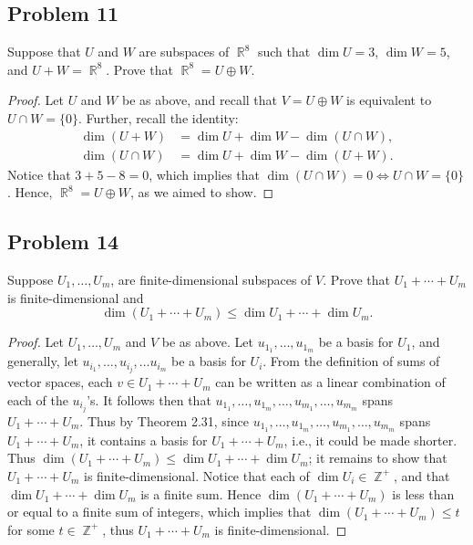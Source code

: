 \documentclass[letterpaper, 12pt]{amsart}
\DeclareMathOperator{\Z}{\mathbb{Z}}
\DeclareMathOperator{\R}{\mathbb{R}}
\theoremstyle{definition}  %
\begin{document}
		\subsection*{Problem 11}
		Suppose that $U$ and $W$ are subspaces of $\R^{8}$ such that $\dim U = 3$, $\dim W = 5$, and $U + W = \R^{8}$. 
		Prove that $\R^{8} = U \oplus W$.

		\begin{proof}
		Let $U$ and $W$ be as above, and recall that $V = U \oplus W$ is equivalent to $U \cap W = \{ 0 \}$.
		Further, recall the identity:
			\begin{align*}
				\dim(U + W) &= \dim U + \dim W - \dim(U \cap W), \\
				\dim(U \cap W) &= \dim U + \dim W - \dim(U + W).
			\end{align*}
		Notice that $3 + 5 - 8 = 0$, which implies that $\dim(U \cap W) = 0 \iff U \cap W = \{ 0 \}$.
		Hence, $\R^{8} = U \oplus W$, as we aimed to show.	
		\end{proof}

		\subsection*{Problem 14}
		Suppose $U_{1}, \dots, U_{m}$, are finite-dimensional subspaces of $V$.
		Prove that $U_{1} + \cdots + U_{m}$ is finite-dimensional and $$\dim(U_{1} + \cdots + U_{m}) \leq \dim U_{1} + \cdots + \dim U_{m}.$$

		\begin{proof}
		Let $U_{1}, \dots, U_{m}$ and $V$ be as above.
		Let $u_{1_{1}}, \dots, u_{1_{m}}$ be a basis for $U_{1}$, and generally, let $u_{i_{1}}, \dots, u_{i_{j}}, \dots u_{i_{m}}$ be a basis for $U_{i}$.
		From the definition of sums of vector spaces, each $v \in U_{1} + \cdots + U_{m}$ can be written as a linear combination of each of the $u_{i_{j}}$'s.
		It follows then that $u_{1_{1}}, \dots, u_{1_{m}}, \dots, u_{m_{1}}, \dots, u_{m_{m}}$ spans $U_{1} + \cdots + U_{m}$.
		Thus by Theorem 2.31, since $u_{1_{1}}, \dots, u_{1_{m}}, \dots, u_{m_{1}}, \dots, u_{m_{m}}$ spans $U_{1} + \cdots + U_{m}$, it contains a basis for $U_{1} + \cdots + U_{m}$, i.e., it could be made shorter.
		Thus $\dim(U_{1} + \cdots + U_{m}) \leq \dim U_{1} + \cdots + \dim U_{m}$; it remains to show that $U_{1} + \cdots + U_{m}$ is finite-dimensional.
		Notice that each of $\dim U_{i} \in \Z^{+}$, and that $\dim U_{1} + \cdots + \dim U_{m}$ is a finite sum.
		Hence $\dim(U_{1} + \cdots + U_{m})$ is less than or equal to a finite sum of integers, which implies that $\dim(U_{1} + \cdots + U_{m}) \leq t$ for some $t \in \Z^{+}$, thus $U_{1} + \cdots + U_{m}$ is finite-dimensional.
		\end{proof}
\end{document}
